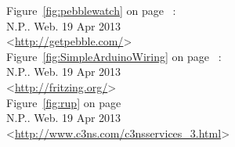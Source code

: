 	Figure~\ref{fig:pebblewatch} on page~\pageref{fig:pebblewatch} : \\
	N.P.. Web. 19 Apr 2013\\
	<\url{http://getpebble.com/}> \\

	Figure~\ref{fig:SimpleArduinoWiring} on page~\pageref{fig:SimpleArduinoWiring} : \\
	N.P.. Web. 19 Apr 2013\\
	<\url{http://fritzing.org/}> \\

	Figure~\ref{fig:rup} on page~\pageref{fig:rup} \\
	N.P.. Web. 19 Apr 2013\\
	<\url{http://www.c3ns.com/c3nsservices_3.html}> \\
